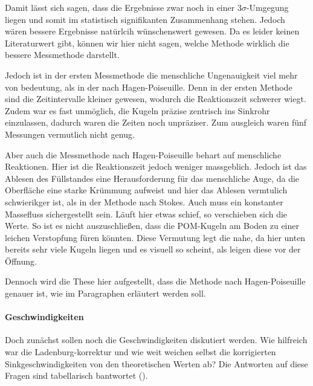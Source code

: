 
Damit lässt sich sagen, dass die Ergebnisse zwar noch in einer $3\sigma$-Umgegung liegen und somit im statistisch signifikanten Zusammenhang stehen. Jedoch wären bessere Ergebnisse natürlcih wünschenswert gewesen. 
Da es leider keinen Literaturwert gibt, können wir hier nicht sagen, welche Methode wirklich die bessere Messmethode darstellt. 

Jedoch ist in der ersten Messmethode die menschliche Ungenauigkeit viel mehr von bedeutung, als in der nach Hagen-Poiseuille. Denn in der ersten Methode sind die Zeitintervalle kleiner gewesen, wodurch die Reaktionszeit schwerer wiegt. Zudem war es fast unmöglich, die Kugeln präzise zentrisch ins Sinkrohr einzulassen, dadurch waren die Zeiten noch unpräziser. Zum ausgleich waren fünf Messungen vermutlich nicht genug.

Aber auch die Messmethode nach Hagen-Poiseuille behart auf menschliche Reaktionen. Hier ist die Reaktionszeit jedoch weniger massgeblich. Jedoch ist das Ablesen des Füllstandes eine Herausforderung für das menschliche Auge, da die Oberfläche eine starke Krümmung aufweist und hier das Ablesen vermtulich schwierikger ist, als in der Methode nach Stokes. Auch muss ein konstanter Massefluss sichergestellt sein. Läuft hier etwas schief, so verschieben sich die Werte. So ist es nicht auszuschließen, dass die POM-Kugeln am Boden zu einer leichen Verstopfung füren könnten. Diese Vermutung legt die  nahe, da hier unten bereits sehr viele Kugeln liegen und es visuell so scheint, als leigen diese vor der Öffnung.

Dennoch wird die These hier aufgestellt, dass die Methode nach Hagen-Poiseuille genauer ist, wie im Paragraphen  erläutert werden soll.

\paragraph{Geschwindigkeiten}

Doch zunächst sollen noch die Geschwindigkeiten diskutiert werden. Wie hilfreich war die Ladenburg-korrektur und wie weit weichen selbst die korrigierten Sinkgeschwindigkeiten von den theoretischen Werten ab?
Die Antworten auf diese Fragen sind tabellarisch bantwortet ().


